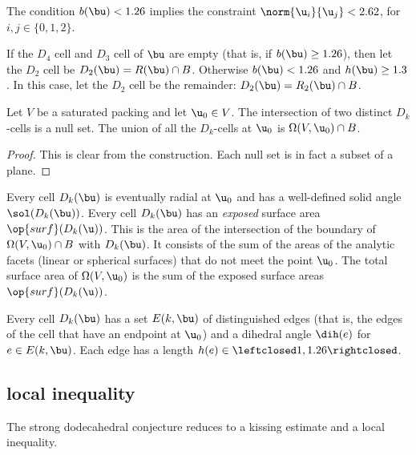 The condition $b(\bu)< 1.26$ implies the constraint $\norm{ \u_i}{
  \u_j}< 2.62$, for $i,j\in\{0,1,2\}$.

\begin{definition}[$D_2$]
  If the $D_4$ cell and $D_3$ cell of $\bu$ are empty (that is, if
  $b(\bu)\ge 1.26$), then let the $D_2$ cell be $D_2(\bu)=R(\bu)\cap
  B$.  Otherwise $b(\bu)< 1.26$ and $h(\bu) \ge 1.3$.  In this case,
  let the $D_2$ cell be the remainder: $D_2(\bu)=R_2(\bu)\cap B$.
\end{definition}

\begin{lemma}[]
  Let $V$ be a saturated packing and let $\u_0\in V$.  The
  intersection of two distinct $D_k$-cells is a null set.  The union
  of all the $D_k$-cells at $\u_0$ is $\Omega(V, \u_0)\cap B$.
\end{lemma}
%

\begin{proof} This is clear from the construction.  Each null set is
  in fact a subset of a plane.
\end{proof}

Every cell $D_k(\bu)$ is eventually radial at $ \u_0$ and has a
well-defined solid angle $\sol(D_k(\bu))$.  Every cell $D_k(\bu)$ has
an {\it exposed} surface area $\op{surf}(D_k(\u))$.  This is the area
of the intersection of the boundary of $\Omega(V, \u_0)\cap B$ with
$D_k(\bu)$.  It consists of the sum of the areas of the analytic
facets (linear or spherical surfaces) that do not meet the point $
\u_0$.  The total surface area of $\Omega(V,\u_0)$ is the sum of the
exposed surface areas $\op{surf}(D_k(\u))$.  %
%
%
%


Every cell $D_k(\bu)$ has a set $E(k,\bu)$ of distinguished edges
(that is, the edges of the cell that have an endpoint at $\u_0$) and a
dihedral angle $\dih(e)$ for $e\in E(k,\bu)$.  Each edge has a length
$h(e)\in\leftclosed1,1.26\rightclosed$.  %
%
%
%

\subsection{local inequality}

The strong dodecahedral conjecture reduces to a kissing estimate and a
local inequality.  %


